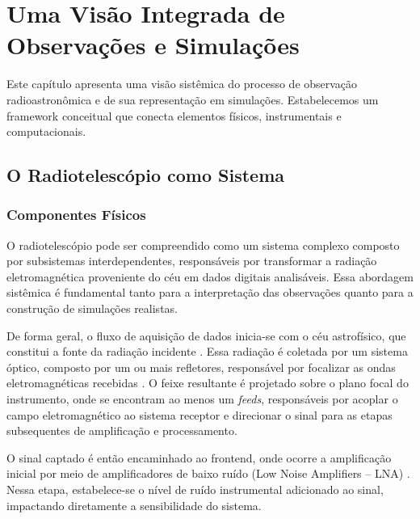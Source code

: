 \chapter{Uma Visão Integrada de Observações e Simulações}

Este capítulo apresenta uma visão sistêmica do processo de observação radioastronômica e de sua representação em simulações. Estabelecemos um framework conceitual que conecta elementos físicos, instrumentais e computacionais.

\section{O Radiotelescópio como Sistema}

\subsection{Componentes Físicos}

O radiotelescópio pode ser compreendido como um sistema complexo composto por subsistemas interdependentes, responsáveis por transformar a radiação eletromagnética proveniente do céu em dados digitais analisáveis. Essa abordagem sistêmica é fundamental tanto para a interpretação das observações quanto para a construção de simulações realistas.

De forma geral, o fluxo de aquisição de dados inicia-se com o céu astrofísico, que constitui a fonte da radiação incidente \cite{wilson2013tools}. Essa radiação é coletada por um sistema óptico, composto por um ou mais refletores, responsável por focalizar as ondas eletromagnéticas recebidas \cite{sasao2009_radioantennas}. O feixe resultante é projetado sobre o plano focal do instrumento, onde se encontram ao menos um \textit{feeds}, responsáveis por acoplar o campo eletromagnético ao sistema receptor e direcionar o sinal para as etapas subsequentes de amplificação e processamento.

O sinal captado é então encaminhado ao frontend, onde ocorre a amplificação inicial por meio de amplificadores de baixo ruído (Low Noise Amplifiers – LNA) \cite{INPE2024BINGO}. Nessa etapa, estabelece-se o nível de ruído instrumental adicionado ao sinal, impactando diretamente a sensibilidade do sistema.

